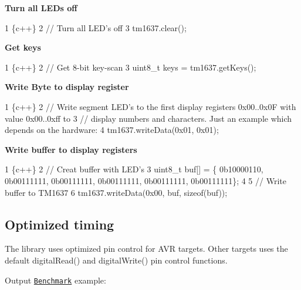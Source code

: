 {\bfseries Turn all L\+ED\textquotesingle{}s off}


\begin{DoxyCode}
1 \{c++\}
2 // Turn all LED's off
3 tm1637.clear();
\end{DoxyCode}


{\bfseries Get keys}


\begin{DoxyCode}
1 \{c++\}
2 // Get 8-bit key-scan
3 uint8\_t keys = tm1637.getKeys();
\end{DoxyCode}


{\bfseries Write Byte to display register}


\begin{DoxyCode}
1 \{c++\}
2 // Write segment LED's to the first display registers 0x00..0x0F with value 0x00..0xff to
3 // display numbers and characters. Just an example which depends on the hardware:
4 tm1637.writeData(0x01, 0x01);
\end{DoxyCode}


{\bfseries Write buffer to display registers}


\begin{DoxyCode}
1 \{c++\}
2 // Creat buffer with LED's
3 uint8\_t buf[] = \{ 0b10000110, 0b00111111, 0b00111111, 0b00111111, 0b00111111, 0b00111111\};
4 
5 // Write buffer to TM1637
6 tm1637.writeData(0x00, buf, sizeof(buf));
\end{DoxyCode}


\subsection*{Optimized timing}

The library uses optimized pin control for A\+VR targets. Other targets uses the default digital\+Read() and digital\+Write() pin control functions.

Output \href{https://github.com/Erriez/ErriezTM1637/blob/master/examples/Benchmark/Benchmark.ino}{\tt Benchmark} example\+:

